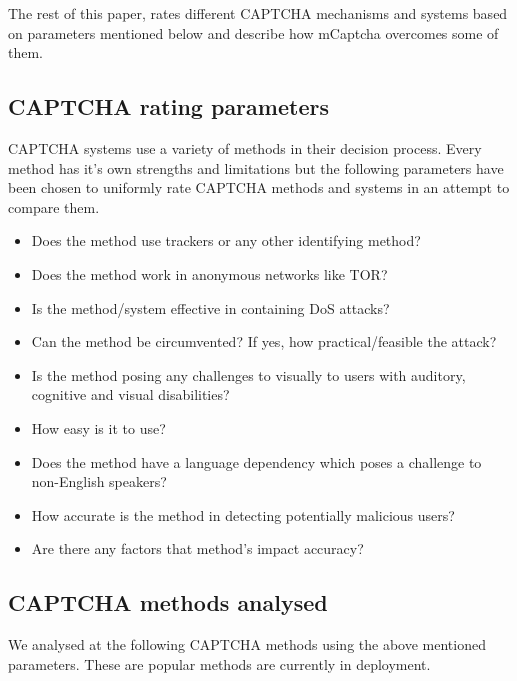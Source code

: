 \documentclass[conference]{IEEEtran}
\begin{document}
The rest of this paper, rates different CAPTCHA mechanisms and systems based on
parameters mentioned below and describe how mCaptcha overcomes some of
them. 

\subsection{CAPTCHA rating parameters}
CAPTCHA systems use a variety of methods in their decision process. Every method
has it's own strengths and limitations but the following parameters have been
chosen to uniformly rate CAPTCHA methods and systems in an attempt to compare
them.
\begin{description}
\item[Privacy] 
	\begin{itemize}
		\item Does the method use trackers or any other identifying method?
		\item Does the method work in anonymous networks like TOR?
	\end{itemize}
\item[Effectiveness]
	\begin{itemize}
		\item Is the method/system effective in containing DoS attacks? 
		\item Can the method be circumvented? If yes, how practical/feasible
		the attack?

	\end{itemize}
\item[Accessibility]
	\begin{itemize}
		\item Is the method posing any challenges to visually to users
			with auditory, cognitive and visual disabilities? 
		\item How easy is it to use?
		\item Does the method have a language dependency which poses a challenge to
		non-English speakers?
	\end{itemize}
\item[Accuracy]
	\begin{itemize}
		\item How accurate is the method in detecting potentially malicious
			users?
		\item Are there any factors that method's impact accuracy?
	\end{itemize}
\end{description}

\subsection{CAPTCHA methods analysed}
We analysed at the following CAPTCHA methods using the above mentioned
parameters. These are popular methods are currently in deployment.
\end{document}
